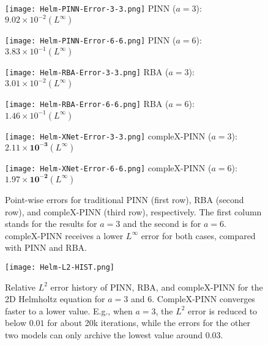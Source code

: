 \begin{figure}[!htb]
    \centering
    \begin{minipage}{0.45\textwidth}
    \centering
    \texttt{[image: Helm-PINN-Error-3-3.png]}  
    \small PINN ($a=3$): $9.02\times 10^{-2} (L^\infty)$
    \end{minipage}
    \begin{minipage}{0.45\textwidth}
    \centering
    \texttt{[image: Helm-PINN-Error-6-6.png]}
    \small PINN ($a=6$): $3.83\times 10^{-1} (L^\infty)$
    \end{minipage}


    
    \begin{minipage}{0.45\textwidth}
    \centering
    \texttt{[image: Helm-RBA-Error-3-3.png]}
    \small RBA ($a=3$): $3.01\times 10^{-2} (L^\infty)$
    \end{minipage}
    \begin{minipage}{0.45\textwidth}
    \centering
    \texttt{[image: Helm-RBA-Error-6-6.png]}  
    \small RBA ($a=6$): $1.46\times 10^{-1} (L^\infty)$
    \end{minipage}

    
    \begin{minipage}{0.45\textwidth}
    \centering
    \texttt{[image: Helm-XNet-Error-3-3.png]}  
    \small compleX-PINN ($a=3$): $\bm{2.11\times 10^{-3}} (L^\infty)$
    \end{minipage}
    \begin{minipage}{0.45\textwidth}
    \centering
    \texttt{[image: Helm-XNet-Error-6-6.png]}
    \small compleX-PINN ($a=6$): $\bm{1.97\times 10^{-2}} (L^\infty)$
    \end{minipage}
    \caption{Point-wise errors for traditional PINN (first row), RBA (second row), and compleX-PINN (third row), respectively. The first column stands for the results for $a = 3$ and the second is for $a = 6$. compleX-PINN receives a lower $L^{\infty}$ error for both cases, compared with PINN and RBA.
    }\label{Helm Point-wise Error}
\end{figure}

\begin{figure}[!htb]
    \centering
    \texttt{[image: Helm-L2-HIST.png]}    
    \vspace{1em}
    \caption{Relative \( L^2 \) error history of PINN, RBA, and compleX-PINN for the 2D Helmholtz equation for $a = 3$ and $6$. CompleX-PINN converges faster to a lower value. E.g., when $a = 3$, the $L^2$ error is reduced to below $0.01$ for about 20k iterations, while the errors for the other two models can only archive the lowest value around $0.03$.}\label{Helm-HIST}
\end{figure}